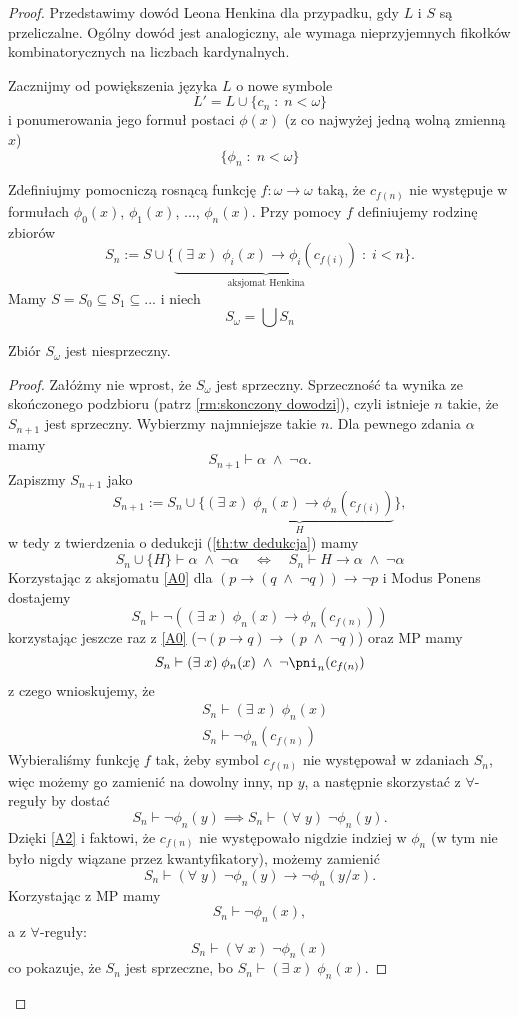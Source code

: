 \begin{proof}
  Przedstawimy dowód Leona Henkina dla przypadku, gdy $L$ i $S$ są przeliczalne. Ogólny dowód jest analogiczny, ale wymaga nieprzyjemnych fikołków kombinatorycznych na liczbach kardynalnych.

  Zacznijmy od powiększenia języka $L$ o nowe symbole
  $$L'=L\cup\{c_n\;:\;n<\omega\}$$
  i ponumerowania jego formuł postaci $\phi(x)$ (z co najwyżej jedną wolną zmienną $x$)
  $$\{\phi_n\;:\;n<\omega\}$$

  Zdefiniujmy pomocniczą rosnącą funkcję $f:\omega\to\omega$ taką, że $c_{f(n)}$ nie występuje w formułach $\phi_0(x)$, $\phi_1(x)$, ..., $\phi_n(x)$. Przy pomocy $f$ definiujemy rodzinę zbiorów
  $$S_n:=S\cup\{\underbrace{(\exists\;x)\;\phi_i(x)\to\phi_i(c_{f(i)})}_{\text{aksjomat Henkina}}\;:\;i<n\}.$$
  Mamy $S=S_0\subseteq S_1\subseteq ...$ i niech
  $$S_\omega=\bigcup S_n$$

  \begin{fact}{}{}
    Zbiór $S_\omega$ jest niesprzeczny.
  \end{fact}

  \begin{proof}
    Załóżmy nie wprost, że $S_\omega$ jest sprzeczny. Sprzeczność ta wynika ze skończonego podzbioru (patrz \ref{rm:skonczony dowodzi}), czyli istnieje $n$ takie, że $S_{n+1}$ jest sprzeczny. Wybierzmy najmniejsze takie $n$. Dla pewnego zdania $\alpha$ mamy
    $$S_{n+1}\vdash\alpha\;\land\;\neg\alpha.$$
    Zapiszmy $S_{n+1}$ jako
    $$S_{n+1}:=S_n\cup\{\underbrace{(\exists\;x)\;\phi_n(x)\to\phi_n(c_{f(i)})}_{H}\},$$
    w tedy z twierdzenia o dedukcji (\ref{th:tw dedukcja}) mamy
    $$S_n\cup\{H\}\vdash \alpha\;\land\;\neg\alpha\quad\iff\quad S_n\vdash H\to\alpha\;\land\;\neg\alpha$$
    Korzystając z aksjomatu \ref{A0} dla $(p\to(q\;\land\;\neg q))\to\neg p$ i Modus Ponens dostajemy
    $$S_n\vdash \neg((\exists\;x)\;\phi_n(x)\to\phi_n(c_{f(n)}))$$
    korzystając jeszcze raz z \ref{A0} ($\neg(p\to q)\to (p\;\land\;\neg q)$) oraz MP mamy
    $$S_n\vdash (\exists\;x)\;\phi_n(x)\;\land\;\neg\pni_n(c_{f(n)})$$
    z czego wnioskujemy, że
    \begin{align*}
      &S_n\vdash (\exists\;x)\;\phi_n(x)\\ 
      &S_n\vdash \neg\phi_n(c_{f(n)})
    \end{align*}
    Wybieraliśmy funkcję $f$ tak, żeby symbol $c_{f(n)}$ nie występował w zdaniach $S_n$, więc możemy go zamienić na dowolny inny, np $y$, a następnie skorzystać z $\forall$-reguły by dostać
    $$S_n\vdash \neg\phi_n(y)\implies S_n\vdash (\forall\;y)\;\neg\phi_n(y).$$
    Dzięki \ref{A2} i faktowi, że $c_{f(n)}$ nie występowało nigdzie indziej w $\phi_n$ (w tym nie było nigdy wiązane przez kwantyfikatory), możemy zamienić
    $$S_n\vdash (\forall\;y)\;\neg\phi_n(y)\to \neg\phi_n(y/x).$$
    Korzystając z MP mamy
    $$S_n\vdash \neg\phi_n(x),$$
    a z $\forall$-reguły:
    $$S_n\vdash (\forall\;x)\;\neg\phi_n(x)$$
    co pokazuje, że $S_n$ jest sprzeczne, bo $S_n\vdash (\exists\;x)\;\phi_n(x)$.
  \end{proof}







\end{proof}

